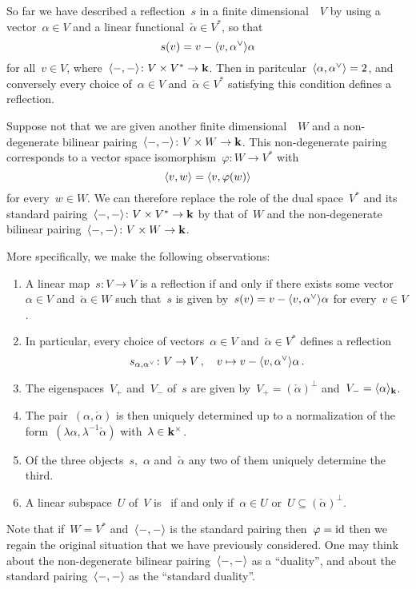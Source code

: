 \begin{fluff}
  \label{reflections using duality}
  So far we have described a reflection~$s$ in a finite dimensional~{\vectorspace{$\kf$}}~$V$ by using a vector~$\alpha \in V$ and a linear functional~$\check{\alpha} \in V^*$, so that
  \[
    s(v)
    =
    v - \pair{v, \check{\alpha}} \alpha
  \]
  for all~$v \in V$, where~$\langle-,-\rangle \colon V \times V^* \to \mathbf{k}$.
  Then in paritcular~$\pair{\alpha, \check{\alpha}} = 2$, and conversely every choice of~$\alpha \in V$ and~$\check{\alpha} \in V^*$ satisfying this condition defines a reflection.
  
  Suppose not that we are given another finite dimensional~{\vectorspace{$\kf$}}~$W$ and a non-degenerate bilinear pairing~$\langle-,-\rangle \colon V \times W \to \mathbf{k}$.
  This non-degenerate pairing corresponds to a vector space isomorphism~$\varphi \colon W \to V^*$ with
  \[
    \langle v, w\rangle
    =
    \langle v, \varphi(w)\rangle
  \]
  for every~$w \in W$.
  We can therefore replace the role of the dual space~$V^*$ and its standard pairing~$\langle-,-\rangle \colon V \times V^* \to \mathbf{k}$ by that of~$W$ and the non-degenerate bilinear pairing~$\langle-,-\rangle \colon V \times W \to \mathbf{k}$.
  
  More specifically, we make the following observations:
  \begin{enumerate}
    \item
      A linear map~$s \colon V \to V$ is a reflection if and only if there exists some vector~$\alpha \in V$ and~$\check{\alpha} \in W$ such that~$s$ is given by~$s(v) = v - \pair{v, \check{\alpha}} \alpha$ for every~$v \in V$.
    \item
      In particular, every choice of vectors~$\alpha \in V$ and~$\check{\alpha} \in V^*$ defines a reflection
      \[
        s_{\alpha, \check{\alpha}}
        \colon
        V
        \to
        V \,,
        \quad
        v
        \mapsto
        v - \pair{v, \check{\alpha}} \alpha \,.
      \]
    \item
      The eigenspaces~$V_+$ and~$V_-$ of~$s$ are given by~$V_+ = (\check{\alpha})^\perp$ and~$V_- = \langle\alpha\rangle_{\mathbf{k}}$.
    \item
      The pair~$(\alpha, \check{\alpha})$ is then uniquely determined up to a normalization of the form~$(\lambda \alpha, \lambda^{-1} \check{\alpha})$ with~$\lambda \in \mathbf{k}^\times$.
    \item
      Of the three objects~$s$,~$\alpha$ and~$\check{\alpha}$ any two of them uniquely determine the third.
    \item
      A linear subspace~$U$ of~$V$ is~{} if and only if~$\alpha \in U$ or~$U \subseteq (\check{\alpha})^\perp$.
  \end{enumerate}
  
  Note that if~$W = V^*$ and~$\langle-,-\rangle$ is the standard pairing then~$\varphi = \operatorname{id}$ then we regain the original situation that we have previously considered.
  One may think about the non-degenerate bilinear pairing~$\langle-,-\rangle$ as a \enquote{duality}, and about the standard pairing~$\langle-,-\rangle$ as the \enquote{standard duality}.
\end{fluff}


